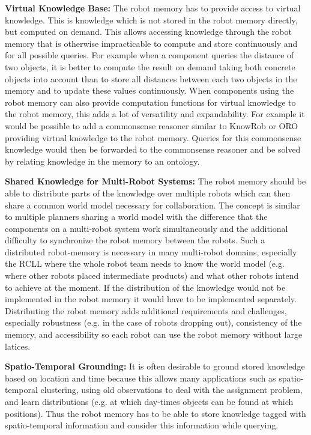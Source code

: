 \documentclass[a4paper,11pt]{article}
\begin{document}
\smallskip
\textbf{Virtual Knowledge Base:} The robot memory has to provide
access to virtual knowledge. This is knowledge which is not stored in
the robot memory directly, but computed on demand. This allows
accessing knowledge through the robot memory that is otherwise
impracticable to compute and store continuously and for all possible
queries. For example when a component queries the distance of two
objects, it is better to compute the result on demand taking both
concrete objects into account than to store all distances between each
two objects in the memory and to update these values continuously.
When components using the robot memory can also provide computation
functions for virtual knowledge to the robot memory, this adds a lot of
versatility and expandability. For example it would be possible to add
a commonsense reasoner similar to KnowRob or ORO providing virtual
knowledge to the robot memory. Queries for this commonsense knowledge
would then be forwarded to the commonsense reasoner and be solved by
relating knowledge in the memory to an ontology.

\smallskip
\textbf{Shared Knowledge for Multi-Robot Systems:} The robot memory
should be able to distribute parts of the knowledge over multiple
robots which can then share a common world model necessary for
collaboration. The concept is similar to multiple planners sharing a
world model with the difference that the components on a multi-robot
system work simultaneously and the additional difficulty to
synchronize the robot memory between the robots. Such a distributed
robot-memory is necessary in many multi-robot domains, especially the
RCLL where the whole robot team needs to know the world model
(e.g. where other robots placed intermediate products) and what other
robots intend to achieve at the moment. If the distribution of the
knowledge would not be implemented in the robot memory it would have
to be implemented separately. Distributing the robot memory adds
additional requirements and challenges, especially robustness (e.g. in
the case of robots dropping out), consistency of the memory, and
accessibility so each robot can use the robot memory without large
latices.

\smallskip
\textbf{Spatio-Temporal Grounding:} It is often desirable to ground
stored knowledge based on location and time because this allows many
applications such as spatio-temporal clustering, using old
observations to deal with the assignment problem, and learn
distributions (e.g. at which day-times objects can be found at which
positions). Thus the robot memory has to be able to store knowledge
tagged with spatio-temporal information and consider this information
while querying.
\end{document}
